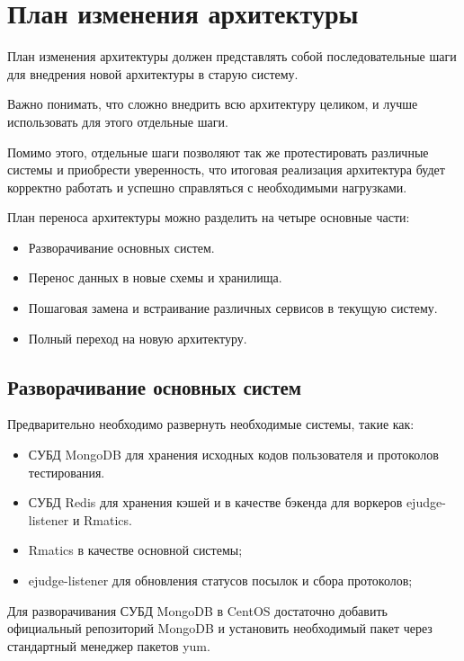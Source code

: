 \section{План изменения архитектуры}

План изменения архитектуры должен представлять собой 
последовательные шаги для внедрения новой архитектуры в старую систему.

Важно понимать, что сложно внедрить всю архитектуру целиком, и лучше использовать для этого отдельные шаги.

Помимо этого, отдельные шаги позволяют так же протестировать различные системы и приобрести уверенность, 
что итоговая реализация архитектура будет корректно работать и успешно справляться с необходимыми нагрузками.

План переноса архитектуры можно разделить на четыре основные части:

\begin{itemize}
    \item Разворачивание основных систем.
    \item Перенос данных в новые схемы и хранилища.
    \item Пошаговая замена и встраивание различных сервисов в текущую систему.
    \item Полный переход на новую архитектуру.
\end{itemize}

\subsection{Разворачивание основных систем}

Предварительно необходимо развернуть необходимые системы, такие как:

\begin{itemize}
    \item СУБД MongoDB для хранения исходных кодов пользователя и протоколов тестирования.
    \item СУБД Redis для хранения кэшей и в качестве бэкенда для воркеров ejudge-listener и Rmatics.
    \item Rmatics в качестве основной системы;
    \item ejudge-listener для обновления статусов посылок и сбора протоколов;
\end{itemize}

Для разворачивания СУБД MongoDB в CentOS достаточно добавить официальный репозиторий MongoDB и установить необходимый пакет через стандартный менеджер пакетов yum.

